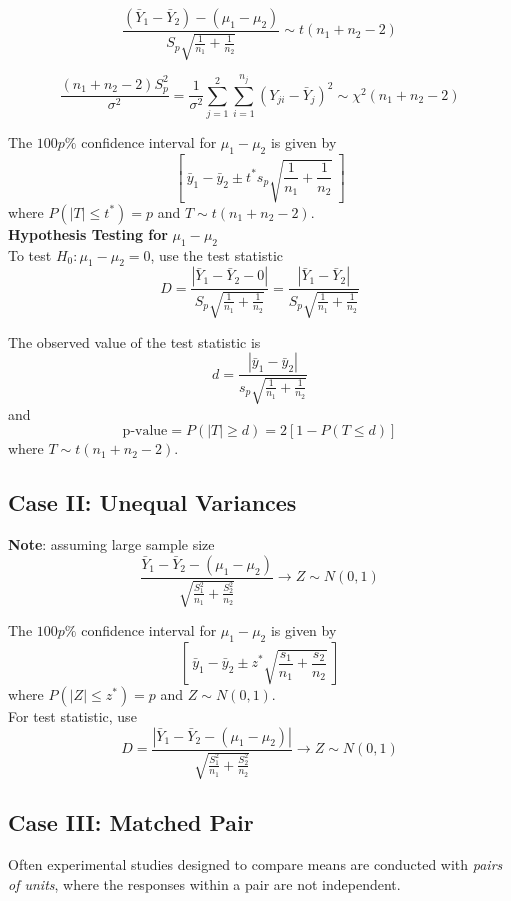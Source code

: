 \documentclass[12pt]{article}
\theoremstyle{definition}
\begin{document}
  $$\frac{(\bar{Y}_{1} - \bar{Y}_{2}) - (\mu_{1} - \mu_{2})}
  {S_{p}\sqrt{\frac{1}{n_{1}} + \frac{1}{n_{2}}}} \sim t(n_{1} + n_{2} - 2)$$

  $$\frac{(n_{1} + n_{2} - 2)S_{p}^{2}}{\sigma^2} =
  \frac{1}{\sigma^2}\sum_{j=1}^{2}\sum_{i=1}^{n_{j}}(Y_{ji} - \bar{Y}_{j})^{2} \sim
  \chi^{2}(n_{1} + n_{2} - 2)$$

  The $100p\%$ confidence interval for $\mu_{1} - \mu_{2}$ is given by
  $$\left[~\bar{y}_1 - \bar{y}_2 \pm t^{*}s_{p}\sqrt{\frac{1}{n_{1}} + \frac{1}{n_{2}}}~\right]$$
  where $P(|T| \leq t^{*}) = p$ and $T \sim t(n_{1} + n_{2} - 2)$. \\

  \textbf{Hypothesis Testing for} $\mu_{1} - \mu_{2}$ \\
  To test $H_{0} : \mu_{1} - \mu_{2} = 0$, use the test statistic
  $$D = \frac{|\bar{Y}_{1} - \bar{Y}_{2} - 0|}{S_{p}\sqrt{\frac{1}{n_{1}} + \frac{1}{n_{2}}}}
  = \frac{|\bar{Y}_{1} - \bar{Y}_{2}|}{S_{p}\sqrt{\frac{1}{n_{1}} + \frac{1}{n_{2}}}}$$

  The observed value of the test statistic is
  $$d = \frac{|\bar{y}_{1} - \bar{y}_{2}|}{s_{p}\sqrt{\frac{1}{n_{1}} + \frac{1}{n_{2}}}}$$
  and
  $$\text{p-value} = P(|T| \geq d) = 2[1 - P(T \leq d)]$$
  where $T \sim t(n_{1} + n_{2} - 2)$.

  \subsection{Case II: Unequal Variances}
  \textbf{Note}: assuming large sample size
  $$\frac{\bar{Y}_{1} - \bar{Y}_{2} - (\mu_{1} - \mu_{2})}
  {\sqrt{\frac{S_{1}^{2}}{n_{1}} + \frac{S_{2}^{2}}{n_{2}}}}
  \rightarrow Z \sim N(0, 1)$$

  The $100p\%$ confidence interval for $\mu_{1} - \mu_{2}$ is given by
  $$\left[~\bar{y}_1 - \bar{y}_2 \pm z^{*}\sqrt{\frac{s_1}{n_{1}} + \frac{s_2}{n_{2}}}~\right]$$
  where $P(|Z| \leq z^{*}) = p$ and $Z \sim N(0, 1)$. \\

  For test statistic, use
  $$D = \frac{|\bar{Y}_{1} - \bar{Y}_{2} - (\mu_{1} - \mu_{2})|}
  {\sqrt{\frac{S_{1}^{2}}{n_{1}} + \frac{S_{2}^{2}}{n_{2}}}}
  \rightarrow Z \sim N(0, 1)$$

  \subsection{Case III: Matched Pair}
  Often experimental studies designed to compare means are conducted with \emph{pairs of units}, where the responses within a pair are not independent. \\
\end{document}
